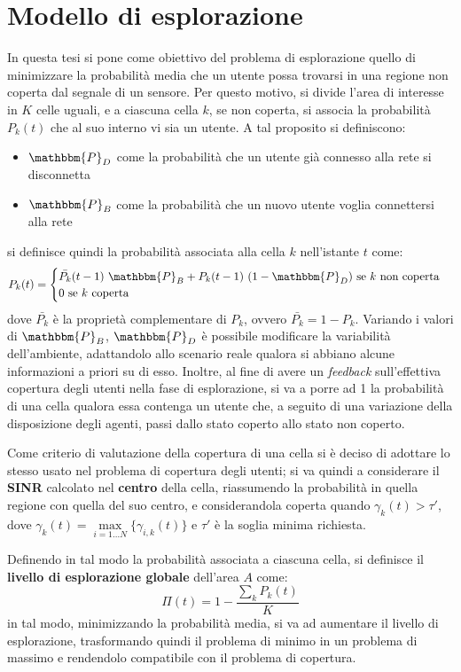 \section{Modello di esplorazione} \label{sec:modello_esplorazione}
In questa tesi si pone come obiettivo del problema di esplorazione quello di minimizzare la probabilità media che un utente possa trovarsi in una regione non coperta dal segnale di un sensore.
Per questo motivo, si divide l'area di interesse in $K$ celle uguali, e a ciascuna cella $k$, se non coperta, si associa la probabilità $P_k(t)$ che al suo interno vi sia un utente.
A tal proposito si definiscono:
\begin{itemize}
    \item $\mathbbm{P}_D$ come la probabilità che un utente già connesso alla rete si disconnetta

    \item $\mathbbm{P}_B$ come la probabilità che un nuovo utente voglia connettersi alla rete     
\end{itemize}
si definisce quindi la probabilità associata alla cella $k$ nell'istante $t$ come:
\begin{equation}
    \label{eq:prob_cella}
    P_k(t) = \begin{cases}
        \bar{P_k}(t-1)\ \mathbbm{P}_B + P_k(t-1)\ (1-\mathbbm{P}_D) \text{ se } k \text{ non coperta} \\
        0 \text{ se } k \text{ coperta}
    \end{cases}
\end{equation}
dove $\bar{P_k}$ è la proprietà complementare di $P_k$, ovvero $\bar{P_k} = 1-P_k$.
Variando i valori di $\mathbbm{P}_B$, $\mathbbm{P}_D$ è possibile modificare la variabilità dell'ambiente, adattandolo allo scenario reale qualora si abbiano alcune informazioni a priori su di esso.
Inoltre, al fine di avere un \textit{feedback} sull'effettiva copertura degli utenti nella fase di esplorazione, si va a porre ad 1 la probabilità di una cella qualora essa contenga un utente che, a seguito di una variazione della disposizione degli agenti, passi dallo stato coperto allo stato non coperto.

Come criterio di valutazione della copertura di una cella si è deciso di adottare lo stesso usato nel problema di copertura degli utenti; si va quindi a considerare il \textbf{SINR} calcolato nel \textbf{centro} della cella, riassumendo la probabilità in quella regione con quella del suo centro, e considerandola coperta quando $\gamma_k(t)>\tau'$, dove $\gamma_k(t)=\max\limits_{i=1...N}\{\gamma_{i,k}(t)\}$ e $\tau'$ è la soglia minima richiesta.

Definendo in tal modo la probabilità associata a ciascuna cella, si definisce il \textbf{livello di esplorazione globale} dell'area $A$ come:
\begin{equation}
    \label{eq:global_funct}
    \Pi(t) = 1 - \frac{\sum_k P_k(t)}{K}
\end{equation}
in tal modo, minimizzando la probabilità media, si va ad aumentare il livello di esplorazione, trasformando quindi il problema di minimo in un problema di massimo e rendendolo compatibile con il problema di copertura.
